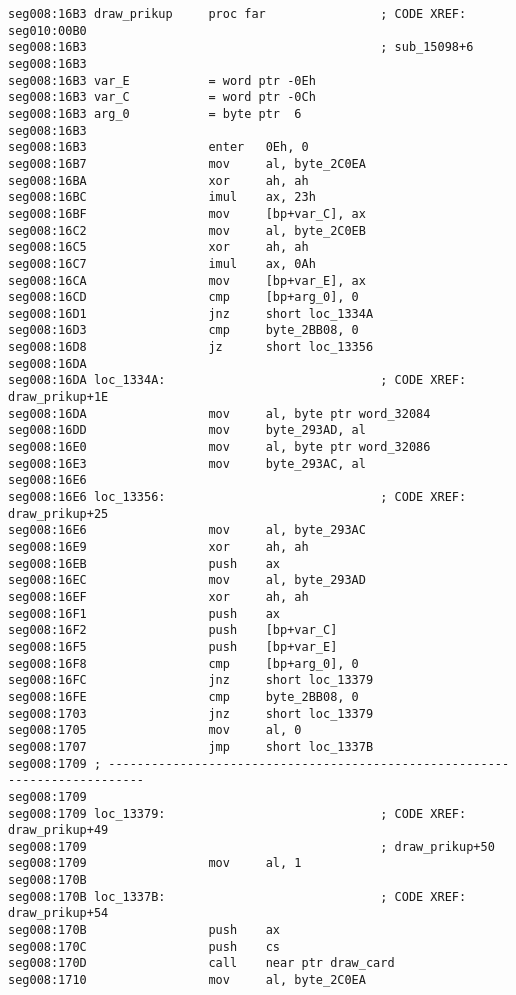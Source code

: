 \begin{lstlisting}
seg008:16B3 draw_prikup     proc far                ; CODE XREF: seg010:00B0
seg008:16B3                                         ; sub_15098+6
seg008:16B3
seg008:16B3 var_E           = word ptr -0Eh
seg008:16B3 var_C           = word ptr -0Ch
seg008:16B3 arg_0           = byte ptr  6
seg008:16B3
seg008:16B3                 enter   0Eh, 0
seg008:16B7                 mov     al, byte_2C0EA
seg008:16BA                 xor     ah, ah
seg008:16BC                 imul    ax, 23h
seg008:16BF                 mov     [bp+var_C], ax
seg008:16C2                 mov     al, byte_2C0EB
seg008:16C5                 xor     ah, ah
seg008:16C7                 imul    ax, 0Ah
seg008:16CA                 mov     [bp+var_E], ax
seg008:16CD                 cmp     [bp+arg_0], 0
seg008:16D1                 jnz     short loc_1334A
seg008:16D3                 cmp     byte_2BB08, 0
seg008:16D8                 jz      short loc_13356
seg008:16DA
seg008:16DA loc_1334A:                              ; CODE XREF: draw_prikup+1E
seg008:16DA                 mov     al, byte ptr word_32084
seg008:16DD                 mov     byte_293AD, al
seg008:16E0                 mov     al, byte ptr word_32086
seg008:16E3                 mov     byte_293AC, al
seg008:16E6
seg008:16E6 loc_13356:                              ; CODE XREF: draw_prikup+25
seg008:16E6                 mov     al, byte_293AC
seg008:16E9                 xor     ah, ah
seg008:16EB                 push    ax
seg008:16EC                 mov     al, byte_293AD
seg008:16EF                 xor     ah, ah
seg008:16F1                 push    ax
seg008:16F2                 push    [bp+var_C]
seg008:16F5                 push    [bp+var_E]
seg008:16F8                 cmp     [bp+arg_0], 0
seg008:16FC                 jnz     short loc_13379
seg008:16FE                 cmp     byte_2BB08, 0
seg008:1703                 jnz     short loc_13379
seg008:1705                 mov     al, 0
seg008:1707                 jmp     short loc_1337B
seg008:1709 ; ---------------------------------------------------------------------------
seg008:1709
seg008:1709 loc_13379:                              ; CODE XREF: draw_prikup+49
seg008:1709                                         ; draw_prikup+50
seg008:1709                 mov     al, 1
seg008:170B
seg008:170B loc_1337B:                              ; CODE XREF: draw_prikup+54
seg008:170B                 push    ax
seg008:170C                 push    cs
seg008:170D                 call    near ptr draw_card
seg008:1710                 mov     al, byte_2C0EA

\end{lstlisting}
